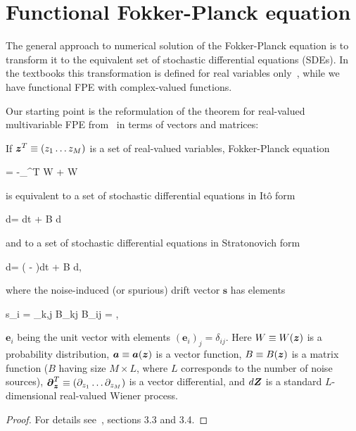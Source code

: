 \section{Functional Fokker-Planck equation}

The general approach to numerical solution of the Fokker-Planck equation is to transform it to the equivalent set of stochastic differential equations (SDEs).
In the textbooks this transformation is defined for real variables only~\cite{Risken1996}, while we have functional FPE with complex-valued functions.

Our starting point is the reformulation of the theorem for real-valued multivariable FPE from~\cite{Risken1996} in terms of vectors and matrices:

\begin{lemma}
\label{lmm:app-fpe:fpe-sde-real}
    If $\boldsymbol{z}^T \equiv (z_1 \ldots z_M)$ is a set of real-valued variables,
    Fokker-Planck equation
    \begin{eqn*}
    	= -\boldsymbol{\partial}_{\zvec}^T  W
    	+   W
    \end{eqn*}
    is equivalent to a set of stochastic differential equations in It\^{o} form
    \begin{eqn*}
    	d\zvec =  dt + B d\Zvec
    \end{eqn*}
    and to a set of stochastic differential equations in Stratonovich form
    \begin{eqn*}
    	d\zvec = ( - )dt + B d\Zvec,
    \end{eqn*}
    where the noise-induced (or spurious) drift vector $\boldsymbol{s}$ has elements
    \begin{eqn*}
    	s_i
    	= \sum_{k,j} B_{kj}  B_{ij}
    	= ,
    \end{eqn*}
    $\boldsymbol{e}_i$ being the unit vector with elements $(\boldsymbol{e}_i)_j = \delta_{ij}$.
    Here $W \equiv W(\boldsymbol{z})$ is a probability distribution,
    $\boldsymbol{a} \equiv \boldsymbol{a}(\boldsymbol{z})$ is a vector function,
    $B \equiv B(\boldsymbol{z})$ is a matrix function ($B$ having size $M \times L$, where $L$ corresponds to the number of noise sources),
    $\boldsymbol{\partial}_{\boldsymbol{z}}^T \equiv (\partial_{z_1} \ldots \partial_{z_M})$ is a vector differential,
    and $d\boldsymbol{Z}$ is a standard $L$-dimensional real-valued Wiener process.
\end{lemma}
\begin{proof}
For details see~\cite{Risken1996}, sections 3.3 and 3.4.
\end{proof}

